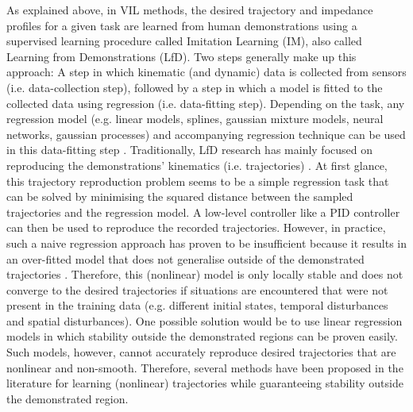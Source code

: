 As explained above, in VIL methods, the desired trajectory and impedance profiles for a given task are learned from human demonstrations using a supervised learning procedure called Imitation Learning (IM), also called Learning from Demonstrations (LfD). Two steps generally make up this approach: A step in which kinematic (and dynamic) data is collected from sensors (i.e. data-collection step), followed by a step in which a model is fitted to the collected data using regression (i.e. data-fitting step). Depending on the task, any regression model (e.g. linear models, splines, gaussian mixture models, neural networks, gaussian processes) and accompanying regression technique can be used in this data-fitting step \cite{kroemerReviewRobotLearning2021,husseinImitationLearningSurvey2017}. Traditionally, LfD research has mainly focused on reproducing the demonstrations' kinematics (i.e. trajectories) \cite{siReviewManipulationSkill2021}. At first glance, this trajectory reproduction problem seems to be a simple regression task that can be solved by minimising the squared distance between the sampled trajectories and the regression model. A low-level controller like a PID controller can then be used to reproduce the recorded trajectories. However, in practice, such a naive regression approach has proven to be insufficient because it results in an over-fitted model that does not generalise outside of the demonstrated trajectories \cite{sindhwaniLearningContractingVector2018}. Therefore, this (nonlinear) model is only locally stable and does not converge to the desired trajectories if situations are encountered that were not present in the training data (e.g. different initial states, temporal disturbances and spatial disturbances). One possible solution would be to use linear regression models in which stability outside the demonstrated regions can be proven easily. Such models, however, cannot accurately reproduce desired trajectories that are nonlinear and non-smooth. Therefore, several methods have been proposed in the literature for learning (nonlinear) trajectories while guaranteeing stability outside the demonstrated region.

